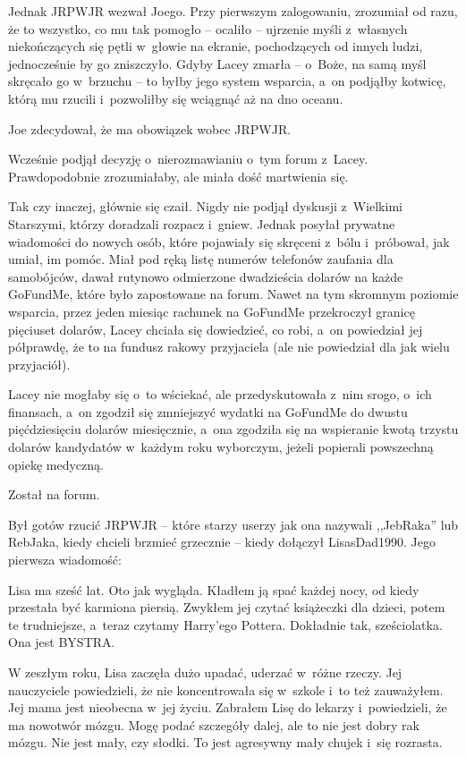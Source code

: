 \documentclass[oneside,polish,11pt,sfheadings]{mwbk}
\begin{document}
Jednak JRPWJR wezwał Joego. Przy pierwszym zalogowaniu, zrozumiał od
razu, że to wszystko, co mu tak pomogło -- ocaliło -- ujrzenie myśli z~własnych niekończących się pętli w~głowie na ekranie, pochodzących od
innych ludzi, jednocześnie by go zniszczyło. Gdyby Lacey zmarła -- o~Boże, na samą myśl skręcało go w~brzuchu -- to byłby jego system
wsparcia, a~on podjąłby kotwicę, którą mu rzucili i~pozwoliłby się
wciągnąć aż na dno oceanu.

Joe zdecydował, że ma obowiązek wobec JRPWJR.

Wcześnie podjął decyzję o~nierozmawianiu o~tym forum z~Lacey.
Prawdopodobnie zrozumiałaby, ale miała dość martwienia się.

Tak czy inaczej, głównie się czaił. Nigdy nie podjął dyskusji z~Wielkimi
Starszymi, którzy doradzali rozpacz i~gniew. Jednak posyłał prywatne
wiadomości do nowych osób, które pojawiały się skręceni z~bólu i~próbował, jak umiał, im pomóc. Miał pod ręką listę numerów telefonów
zaufania dla samobójców, dawał rutynowo odmierzone dwadzieścia dolarów
na każde GoFundMe, które było zapostowane na forum. Nawet na tym
skromnym poziomie wsparcia, przez jeden miesiąc rachunek na GoFundMe
przekroczył granicę pięciuset dolarów, Lacey chciała się dowiedzieć, co
robi, a~on powiedział jej półprawdę, że to na fundusz rakowy przyjaciela
(ale nie powiedział dla jak wielu przyjaciół).

Lacey nie mogłaby się o~to wściekać, ale przedyskutowała z~nim srogo, o~ich finansach, a~on zgodził się zmniejszyć wydatki na GoFundMe do dwustu
pięćdziesięciu dolarów miesięcznie, a~ona zgodziła się na wspieranie
kwotą trzystu dolarów kandydatów w~każdym roku wyborczym, jeżeli
popierali powszechną opiekę medyczną.

Został na forum.

Był gotów rzucić JRPWJR -- które starzy userzy jak ona nazywali
,,JebRaka'' lub RebJaka, kiedy chcieli brzmieć grzecznie -- kiedy
dołączył LisasDad1990. Jego pierwsza wiadomość:

Lisa ma sześć lat. Oto jak wygląda. Kładłem ją spać każdej nocy, od
kiedy przestała być karmiona piersią. Zwykłem jej czytać książeczki dla
dzieci, potem te trudniejsze, a~teraz czytamy Harry'ego Pottera.
Dokładnie tak, sześciolatka. Ona jest BYSTRA.

W zeszłym roku, Lisa zaczęła dużo upadać, uderzać w~różne rzeczy. Jej
nauczyciele powiedzieli, że nie koncentrowała się w~szkole i~to też
zauważyłem. Jej mama jest nieobecna w~jej życiu. Zabrałem Lisę do
lekarzy i~powiedzieli, że ma nowotwór mózgu. Mogę podać szczegóły dalej,
ale to nie jest dobry rak mózgu. Nie jest mały, czy słodki. To jest
agresywny mały chujek i~się rozrasta.
\end{document}
